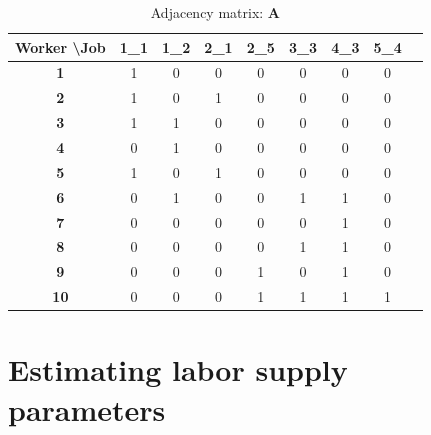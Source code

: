 \documentclass[12pt]{article}
\theoremstyle{definition}
\theoremstyle{plain}
\begin{document}
\begin{table}[h!]
	\centering
	\caption{Adjacency matrix: $\mathbf{A}$}
	\begin{tabular}{c|cccccccc} %
		\toprule
		\textbf{Worker \textbackslash Job} & \textbf{1\_1} & \textbf{1\_2} & \textbf{2\_1} & \textbf{2\_5} & \textbf{3\_3} & \textbf{4\_3} & \textbf{5\_4}  \\
		\midrule
		\textbf{1}                         & 1             & 0             & 0             & 0             & 0             & 0             & 0   \\
		\textbf{2}                         & 1             & 0             & 1             & 0             & 0             & 0             & 0   \\
		\textbf{3}                         & 1             & 1             & 0             & 0             & 0             & 0             & 0   \\
		\textbf{4}                         & 0             & 1             & 0             & 0             & 0             & 0             & 0   \\
		\textbf{5}                         & 1             & 0             & 1             & 0             & 0             & 0             & 0   \\
		\textbf{6}                         & 0             & 1             & 0             & 0             & 1             & 1             & 0   \\
		\textbf{7}                         & 0             & 0             & 0             & 0             & 0             & 1             & 0   \\
		\textbf{8}                         & 0             & 0             & 0             & 0             & 1             & 1             & 0   \\
		\textbf{9}                         & 0             & 0             & 0             & 1             & 0             & 1             & 0   \\
		\textbf{10}                        & 0             & 0             & 0             & 1             & 1             & 1             & 1   \\
	\bottomrule
	\end{tabular}
	\label{table:adjacency_appendix}
\end{table}

\clearpage



\section{Estimating labor supply parameters}
\label{sec:MLE}
\end{document}
